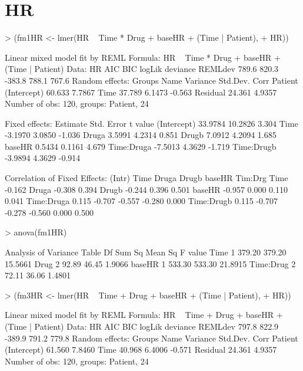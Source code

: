 \documentclass[12pt]{article}
\begin{document}
\section{HR}
\label{sec:HR}
\begin{Schunk}
\begin{Sinput}
> (fm1HR <- lmer(HR ~ Time * Drug + baseHR + (Time | Patient), 
+     HR))
\end{Sinput}
\begin{Soutput}
Linear mixed model fit by REML 
Formula: HR ~ Time * Drug + baseHR + (Time | Patient) 
   Data: HR 
   AIC   BIC logLik deviance REMLdev
 789.6 820.3 -383.8    788.1   767.6
Random effects:
 Groups   Name        Variance Std.Dev. Corr   
 Patient  (Intercept) 60.633   7.7867          
          Time        37.789   6.1473   -0.563 
 Residual             24.361   4.9357          
Number of obs: 120, groups: Patient, 24

Fixed effects:
            Estimate Std. Error t value
(Intercept)  33.9784    10.2826   3.304
Time         -3.1970     3.0850  -1.036
Druga         3.5991     4.2314   0.851
Drugb         7.0912     4.2094   1.685
baseHR        0.5434     0.1161   4.679
Time:Druga   -7.5013     4.3629  -1.719
Time:Drugb   -3.9894     4.3629  -0.914

Correlation of Fixed Effects:
           (Intr) Time   Druga  Drugb  baseHR Tim:Drg
Time       -0.162                                    
Druga      -0.308  0.394                             
Drugb      -0.244  0.396  0.501                      
baseHR     -0.957  0.000  0.110  0.041               
Time:Druga  0.115 -0.707 -0.557 -0.280  0.000        
Time:Drugb  0.115 -0.707 -0.278 -0.560  0.000  0.500 
\end{Soutput}
\begin{Sinput}
> anova(fm1HR)
\end{Sinput}
\begin{Soutput}
Analysis of Variance Table
          Df Sum Sq Mean Sq F value
Time       1 379.20  379.20 15.5661
Drug       2  92.89   46.45  1.9066
baseHR     1 533.30  533.30 21.8915
Time:Drug  2  72.11   36.06  1.4801
\end{Soutput}
\begin{Sinput}
> (fm3HR <- lmer(HR ~ Time + Drug + baseHR + (Time | Patient), 
+     HR))
\end{Sinput}
\begin{Soutput}
Linear mixed model fit by REML 
Formula: HR ~ Time + Drug + baseHR + (Time | Patient) 
   Data: HR 
   AIC   BIC logLik deviance REMLdev
 797.8 822.9 -389.9    791.2   779.8
Random effects:
 Groups   Name        Variance Std.Dev. Corr   
 Patient  (Intercept) 61.560   7.8460          
          Time        40.968   6.4006   -0.571 
 Residual             24.361   4.9357          
Number of obs: 120, groups: Patient, 24


\end{Soutput}
\end{Schunk}
\end{document}

